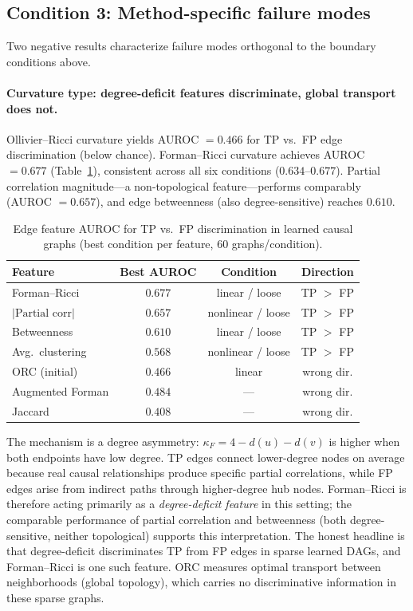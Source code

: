 \documentclass{article}
\begin{document}
\subsection{Condition 3: Method-specific failure modes}
\label{sec:res-failures}

Two negative results characterize failure modes orthogonal to the boundary conditions above.

\paragraph{Curvature type: degree-deficit features discriminate, global transport does not.}
Ollivier--Ricci curvature yields AUROC $= 0.466$ for TP vs.\ FP edge discrimination (below chance).
Forman--Ricci curvature achieves AUROC $= 0.677$ (Table~\ref{tab:curvature}), consistent across all six conditions ($0.634$--$0.677$).
Partial correlation magnitude---a non-topological feature---performs comparably (AUROC $= 0.657$), and edge betweenness (also degree-sensitive) reaches $0.610$.

\begin{table}[t]
\centering
\caption{Edge feature AUROC for TP vs.\ FP discrimination in learned causal graphs (best condition per feature, 60 graphs/condition).}
\label{tab:curvature}
\small
\begin{tabular}{@{}lccc@{}}
\toprule
\textbf{Feature} & \textbf{Best AUROC} & \textbf{Condition} & \textbf{Direction} \\
\midrule
Forman--Ricci & $\mathbf{0.677}$ & linear / loose & TP $>$ FP \\
$|\text{Partial corr}|$ & $0.657$ & nonlinear / loose & TP $>$ FP \\
Betweenness & $0.610$ & linear / loose & TP $>$ FP \\
Avg.\ clustering & $0.568$ & nonlinear / loose & TP $>$ FP \\
\midrule
ORC (initial) & $0.466$ & linear & wrong dir. \\
Augmented Forman & $0.484$ & --- & wrong dir. \\
Jaccard & $0.408$ & --- & wrong dir. \\
\bottomrule
\end{tabular}
\end{table}

The mechanism is a degree asymmetry: $\kappa_F = 4 - d(u) - d(v)$ is higher when both endpoints have low degree.
TP edges connect lower-degree nodes on average because real causal relationships produce specific partial correlations, while FP edges arise from indirect paths through higher-degree hub nodes.
Forman--Ricci is therefore acting primarily as a \emph{degree-deficit feature} in this setting; the comparable performance of partial correlation and betweenness (both degree-sensitive, neither topological) supports this interpretation.
The honest headline is that degree-deficit discriminates TP from FP edges in sparse learned DAGs, and Forman--Ricci is one such feature.
ORC measures optimal transport between neighborhoods (global topology), which carries no discriminative information in these sparse graphs.
\end{document}
